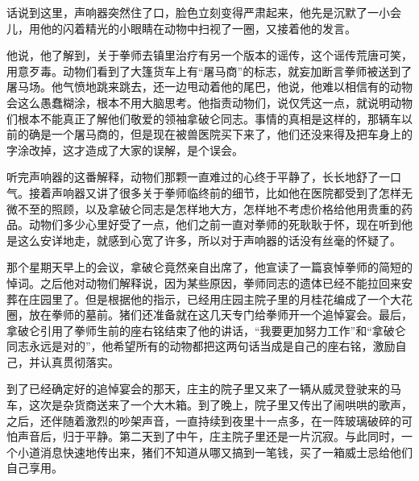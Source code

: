 话说到这里，声响器突然住了口，脸色立刻变得严肃起来，他先是沉默了一小会儿，用他的闪着精光的小眼睛在动物中扫视了一圈，又接着他的发言。

他说，他了解到，关于拳师去镇里治疗有另一个版本的谣传，这个谣传荒唐可笑，用意歹毒。动物们看到了大篷货车上有“屠马商”的标志，就妄加断言拳师被送到了屠马场。他气愤地跳来跳去，还一边甩动着他的尾巴，他说，他难以相信有的动物会这么愚蠢糊涂，根本不用大脑思考。他指责动物们，说仅凭这一点，就说明动物们根本不能真正了解他们敬爱的领袖拿破仑同志。事情的真相是这样的，那辆车以前的确是一个屠马商的，但是现在被兽医院买下来了，他们还没来得及把车身上的字涂改掉，这才造成了大家的误解，是个误会。

听完声响器的这番解释，动物们那颗一直难过的心终于平静了，长长地舒了一口气。接着声响器又讲了很多关于拳师临终前的细节，比如他在医院都受到了怎样无微不至的照顾，以及拿破仑同志是怎样地大方，怎样地不考虑价格给他用贵重的药品。动物们多少心里好受了一点，他们之前一直对拳师的死耿耿于怀，现在听到他是这么安详地走，就感到心宽了许多，所以对于声响器的话没有丝毫的怀疑了。

那个星期天早上的会议，拿破仑竟然亲自出席了，他宣读了一篇哀悼拳师的简短的悼词。之后他对动物们解释说，因为某些原因，拳师同志的遗体已经不能拉回来安葬在庄园里了。但是根据他的指示，已经用庄园主院子里的月桂花编成了一个大花圈，放在拳师的墓前。猪们还准备就在这几天专门给拳师开一个追悼宴会。最后，拿破仑引用了拳师生前的座右铭结束了他的讲话，“我要更加努力工作”和“拿破仑同志永远是对的”，他希望所有的动物都把这两句话当成是自己的座右铭，激励自己，并认真贯彻落实。

到了已经确定好的追悼宴会的那天，庄主的院子里又来了一辆从威灵登驶来的马车，这次是杂货商送来了一个大木箱。到了晚上，院子里又传出了闹哄哄的歌声，之后，还伴随着激烈的吵架声音，一直持续到夜里十一点多，在一阵玻璃破碎的可怕声音后，归于平静。第二天到了中午，庄主院子里还是一片沉寂。与此同时，一个小道消息快速地传出来，猪们不知道从哪又搞到一笔钱，买了一箱威士忌给他们自己享用。
